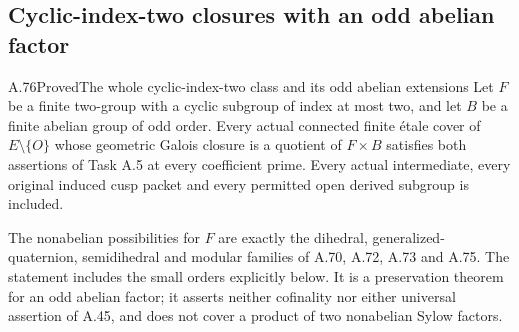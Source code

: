 \subsection{Cyclic-index-two closures with an odd abelian factor}

\begin{statement}{A.76}{Proved}{The whole cyclic-index-two class and its odd abelian extensions}
Let \(F\) be a finite two-group with a cyclic subgroup of
index at most two, and let \(B\) be a finite abelian group
of odd order. Every actual connected finite \'{e}tale cover
of \(E\setminus\{O\}\) whose geometric Galois closure is
a quotient of \(F\times B\) satisfies both assertions
of Task A.5 at every coefficient prime. Every actual
intermediate, every original induced cusp packet and every
permitted open derived subgroup is included.

The nonabelian possibilities for \(F\) are exactly the
dihedral, generalized-quaternion, semidihedral and modular
families of A.70, A.72, A.73 and A.75. The statement
includes the small orders explicitly below. It is a
preservation theorem for an odd abelian factor; it asserts
neither cofinality nor either universal assertion of A.45,
and does not cover a product of two nonabelian Sylow factors.
\end{statement}

